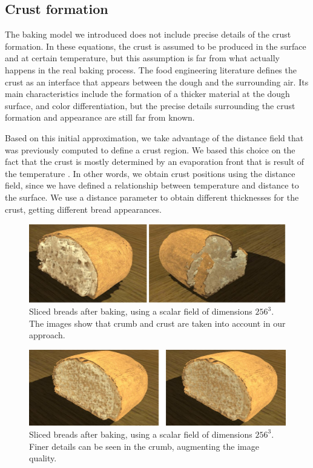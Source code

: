 \documentclass[spanish,a4paper,11pt,oneside,links]{report}
\begin{document}
\subsection{Crust formation}

The baking model we introduced does not include precise details of the crust formation. 
In these equations, the crust is assumed to be produced in the surface and at certain temperature, but this assumption is far from what actually happens in the real baking process. 
The food engineering literature defines the crust as an interface that appears between the dough and the surrounding air.
Its main characteristics include the formation of a thicker material at the dough surface, and color differentiation, but the precise details surrounding the crust formation and appearance are still far from known.

Based on this initial approximation, we take advantage of the distance field that was previously computed to define a crust region.
We based this choice on the fact that the crust is mostly determined by an evaporation front that is result of the temperature \cite{Jefferson2007}. 
In other words, we obtain crust positions using the distance field, since we have defined a relationship between temperature and distance to the surface.
We use a distance parameter to obtain different thicknesses for the crust, getting different bread appearances.

\begin{figure}[!ht]
\begin{center}
\includegraphics[width=15cm]{figures/otherbread}
\caption{Sliced breads after baking, using a scalar field of dimensions $256^{3}$. The images show that crumb and crust are taken into account in our approach.}
\label{fg:renders}
\end{center}
\end{figure}

\begin{figure}[!ht]
\begin{center}
\includegraphics[width=15cm]{figures/otherbread512}
\caption{Sliced breads after baking, using a scalar field of dimensions $256^{3}$. Finer details can be seen in the crumb, augmenting the image quality.}
\label{fg:renders2}
\end{center}
\end{figure}
\end{document}
